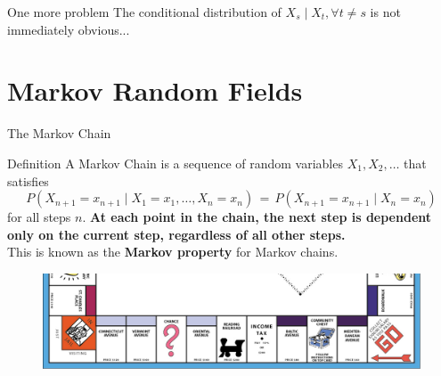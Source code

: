 \documentclass[10pt]{beamer}
\begin{document}
\begin{frame}{One more problem}
The conditional distribution of $X_s \mid X_t, \forall t \neq s$  is not immediately obvious...
\end{frame}

\section{Markov Random Fields}

\begin{frame}{The Markov Chain}
\begin{block}{Definition}
A Markov Chain is a sequence of random variables $X_1, X_2, \ldots$ that satisfies
\[ P(X_{n+1} = x_{n+1} \mid X_1 = x_1, \ldots, X_n = x_n) \,=\, P(X_{n+1} = x_{n+1} \mid X_n = x_n) \]
for all steps $n$. 
\pause
\textbf{At each point in the chain, the next step is dependent only on the current step, regardless of all other steps.}
\\[2ex]
 \pause This is known as the \textbf{Markov property} for Markov chains. 
\end{block}
\pause
\begin{figure}
\centering
\includegraphics[width = 0.6\linewidth]{img/monopoly.png}
\end{figure}
\end{frame}
\end{document}
